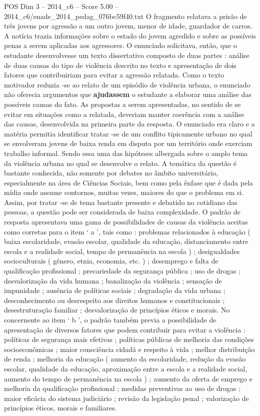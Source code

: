 \begin{textsample}{POS Dim 3 – 2014\_c6 – Score 5.00 – 2014\_c6/enade\_2014\_pedag\_076bc59f40.txt}
O fragmento relatava a prisão de três jovens por agressão a um outro jovem, menor de idade, guardador de carros.
A notícia trazia informações sobre o estado do jovem agredido e sobre as possíveis penas a serem aplicadas aos agressores.
O enunciado solicitava, então, que o estudante desenvolvesse um texto dissertativo composto de duas partes : análise de duas causas do tipo de violência descrito no texto e apresentação de dois fatores que contribuiriam para evitar a agressão relatada.
Como o texto motivador reduzia -se ao relato de um episódio de violência urbana, o enunciado não oferecia argumentos que \textbf{ajudassem} o estudante a elaborar uma análise das possíveis causas do fato.
As propostas a serem apresentadas, no sentido de se evitar em situações como a relatada, deveriam manter coerência com a análise das causas, desenvolvida na primeira parte da resposta.
O enunciado era claro e a matéria permitia identificar tratar -se de um conflito tipicamente urbano no qual se envolveram jovens de baixa renda em disputa por um território onde exerciam trabalho informal.
Sendo essa uma das hipóteses albergada sobre o amplo tema da violência urbana no qual se desenvolve o relato.
A temática da questão é bastante conhecida, não somente por debates no âmbito universitário, especialmente na área de Ciências Sociais, bem como pela ênfase que é dada pela mídia onde assume contornos, muitas vezes, maiores do que o problema em si.
Assim, por tratar -se de tema bastante presente e debatido no cotidiano das pessoas, a questão pode ser considerada de baixa complexidade.
O padrão de resposta apresentava uma gama de possibilidades de causas da violência aceitas como corretas para o item ‘ a ’, tais como : problemas relacionados à educação ( baixa escolaridade, evasão escolar, qualidade da educação, distanciamento entre escola e a realidade social, tempo de permanência na escola ) ; desigualdades socioculturais ( gênero, etnia, economia, etc. ) ; desemprego e falta de qualificação profissional ; precariedade da segurança pública ; uso de drogas ; desvalorização da vida humana ; banalização da violência ; sensação de impunidade ; ausência de políticas sociais ; degradação da vida urbana ; desconhecimento ou desrespeito aos direitos humanos e constitucionais ; desestruturação familiar ; desvalorização de princípios éticos e morais.
No concernente ao item ‘ b ’, o padrão também previa a possibilidade de apresentação de diversos fatores que podem contribuir para evitar a violência : políticas de segurança mais efetivas ; políticas públicas de melhoria das condições socioeconômicas ; maior consciência cidadã e respeito à vida ; melhor distribuição de renda ; melhoria da educação ( aumento da escolaridade, redução da evasão escolar, qualidade da educação, aproximação entre a escola e a realidade social, aumento do tempo de permanência na escola ) ; aumento da oferta de emprego e melhoria da qualificação profissional ; medidas preventivas ao uso de drogas ; maior eficácia do sistema judiciário ; revisão da legislação penal ; valorização de princípios éticos, morais e familiares.

\end{textsample}
